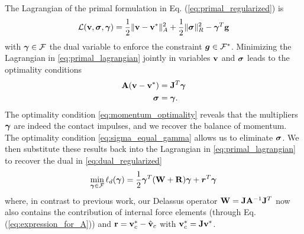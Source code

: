 \begin{IEEEproof}
The Lagrangian of the primal formulation in Eq. (\ref{eq:primal_regularized}) is
\begin{equation}
	\mathcal{L}(\mf{v},\bsigma,\vf{\gamma}) = 
	\frac{1}{2}\Vert\mf{v}-\mf{v}^*\Vert_A^2 + \frac{1}{2} \Vert\bsigma\Vert_{R}^2 - \vf{\gamma}^T\mf{g}
	\label{eq:primal_lagrangian}
\end{equation}
with ${\bm{\gamma}}\in\mathcal{F}$ the dual variable to enforce the constraint
${\bm{g}}\in \mathcal{F}^*$. Minimizing the Lagrangian in
\eqref{eq:primal_lagrangian} jointly in variables ${\mathbf{v}}$ and ${\bm\sigma}$ leads
to the optimality conditions
\begin{subequations}\label{eq:primal_optimality_conditions}
\begin{align}
	\mf{A}(\mf{v}-\mf{v}^*) &= \mf{J}^T\vf{\gamma} \label{eq:momentum_optimality}\\
	\vf{\sigma} &= \vf{\gamma}.  \label{eq:sigma_equal_gamma}
\end{align}
\end{subequations}
The optimality condition \eqref{eq:momentum_optimality} reveals that the
multipliers ${\bm\gamma}$ are indeed the contact impulses, and we recover the balance
of momentum. The optimality condition \eqref{eq:sigma_equal_gamma} allows
us to eliminate ${\bm{\sigma}}$. We then substitute these results back into the
Lagrangian in \eqref{eq:primal_lagrangian} to recover the dual in
\eqref{eq:dual_regularized}
\begin{align*}
	\min_{{\bm\gamma}\in \mathcal{F}} \ell_d({\bm\gamma}) =
	\frac{1}{2}{\bm\gamma}^T(\mathbf{W}+\mathbf{R}){\bm\gamma} + {\bm r}^T
	{\bm\gamma}
\end{align*}
where, in contrast to previous work, our Delassus operator
${\mathbf{W}}={\mathbf{J}}{\mathbf{A}}^{-1}{\mathbf{J}}^T$ now also contains the contribution of internal
force elements (through Eq. (\ref{eq:expression_for_A})) and
${\mathbf{r}}={\mathbf{v}}_c^*-\hat{{\mathbf{v}}}_c$ with ${\mathbf{v}}_c^*={\mathbf{J}}{\mathbf{v}}^*$.
\end{IEEEproof}
